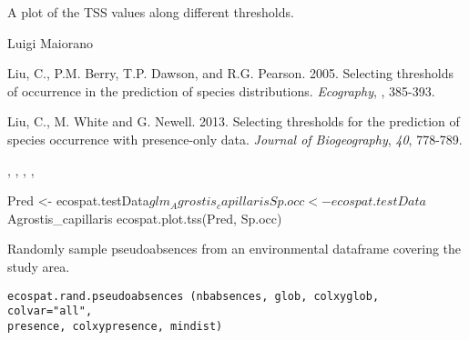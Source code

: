 \documentclass[a4paper]{book}
\begin{document}
%
\begin{Value}
A plot of the TSS values along different thresholds.
\end{Value}
%
\begin{Author}\relax
Luigi Maiorano 
\end{Author}
%
\begin{References}\relax

Liu, C., P.M. Berry, T.P. Dawson, and R.G. Pearson. 2005. Selecting thresholds of occurrence in the prediction of species distributions. \emph{Ecography}, , 385-393.

Liu, C., M. White and G. Newell. 2013. Selecting thresholds for the prediction of species occurrence with presence-only data. \emph{Journal of Biogeography}, \emph{40}, 778-789.

\end{References}
%
\begin{SeeAlso}\relax
{}, , , , 
\end{SeeAlso}
%
\begin{Examples}
\begin{ExampleCode}
Pred <- ecospat.testData$glm_Agrostis_capillaris
Sp.occ <- ecospat.testData$Agrostis_capillaris
ecospat.plot.tss(Pred, Sp.occ)
\end{ExampleCode}
\end{Examples}
%
\begin{Description}\relax
Randomly sample pseudoabsences from an environmental dataframe covering the study area.
\end{Description}
%
\begin{Usage}
\begin{verbatim}
ecospat.rand.pseudoabsences (nbabsences, glob, colxyglob, colvar="all", 
presence, colxypresence, mindist)
\end{verbatim}
\end{Usage}
%
\end{document}
